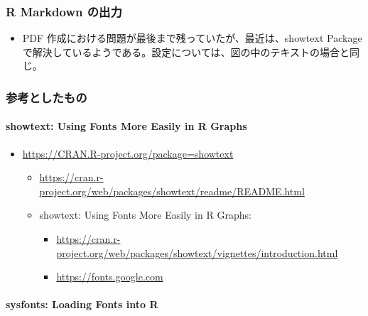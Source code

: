 \documentclass[
]{bxjsbook}
\providecommand{\tightlist}{%
  \setlength{\itemsep}{0pt}\setlength{\parskip}{0pt}}
\theoremstyle{definition}
\theoremstyle{definition}
\theoremstyle{definition}
\theoremstyle{definition}
\theoremstyle{remark}
\begin{document}
\hypertarget{r-markdown-ux306eux51faux529b}{%
\subsubsection{R Markdown の出力}\label{r-markdown-ux306eux51faux529b}}

\begin{itemize}
\tightlist
\item
  PDF 作成における問題が最後まで残っていたが、最近は、showtext Package で解決しているようである。設定については、図の中のテキストの場合と同じ。
\end{itemize}

\hypertarget{ux53c2ux8003ux3068ux3057ux305fux3082ux306e}{%
\subsubsection{参考としたもの}\label{ux53c2ux8003ux3068ux3057ux305fux3082ux306e}}

\hypertarget{showtext-using-fonts-more-easily-in-r-graphs}{%
\paragraph{showtext: Using Fonts More Easily in R Graphs}\label{showtext-using-fonts-more-easily-in-r-graphs}}

\begin{itemize}
\tightlist
\item
  \url{https://CRAN.R-project.org/package=showtext}

  \begin{itemize}
  \tightlist
  \item
    \url{https://cran.r-project.org/web/packages/showtext/readme/README.html}
  \item
    showtext: Using Fonts More Easily in R Graphs:

    \begin{itemize}
    \tightlist
    \item
      \url{https://cran.r-project.org/web/packages/showtext/vignettes/introduction.html}
    \item
      \url{https://fonts.google.com}
    \end{itemize}
  \end{itemize}
\end{itemize}

\hypertarget{sysfonts-loading-fonts-into-r}{%
\paragraph{sysfonts: Loading Fonts into R}\label{sysfonts-loading-fonts-into-r}}
\end{document}
